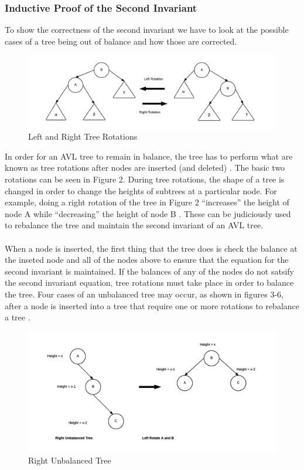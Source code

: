 \documentclass[12pt]{article}
\begin{document}
\subsubsection*{Inductive Proof of the Second Invariant}
To show the correctness of the second invariant we have to look at the possible
cases of a tree being out of balance and how those are corrected.
\begin{figure}[h]
\caption{Left and Right Tree Rotations}
\includegraphics[width=12cm]{tree_rotations.png}
\centering
\end{figure}
\noindent
In order for an AVL tree to remain in balance, the tree has to
perform what are known as tree rotations after nodes are inserted (and deleted)
\cite{wiki:avl}.
The basic two rotations can be seen in Figure 2.  During tree rotations, the
shape of a tree is changed in order to change the heights of subtrees
at a particular node.  For example, doing a right rotation of the tree in
Figure 2 ``increases'' the height of node A while ``decreasing'' the height of
node B \cite{wiki:tree-rotations}.  These can be judiciously used to rebalance
the tree and maintain the second invariant of an AVL tree.\\
\\
When a node is inserted, the first thing that the tree does is check
the balance at the inseted node and all of the nodes above to
ensure that the equation for the second invariant is maintained.  If the
balances of any of the nodes do not satsify the second invariant equation, tree
rotations must take place in order to balance the tree.  
Four cases of an unbalanced tree may occur, as shown in figures 3-6, after a node
is inserted into a tree that require one or more rotations to rebalance a tree
\cite{tutorialspoint:avl}.
\begin{figure}[h]
\caption{Right Unbalanced Tree}
\includegraphics[width=12cm]{right_unbalanced_tree.png}
\centering
\end{figure}
\end{document}

